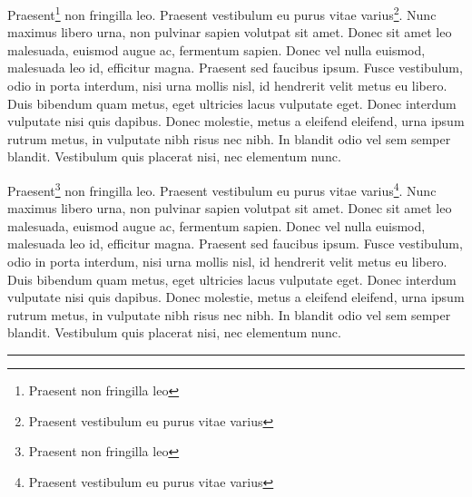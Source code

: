 \documentclass[
]{book}
\newenvironment{env-8f08c627-1fa3-4d4d-933c-e8c841c72ea1}
{
    \savenotes\tcolorbox[blanker,if odd page={left=5pt,borderline west={4pt}{-4pt}{firebrick}}{right=5pt,borderline east={4pt}{-4pt}{firebrick}}]
}
{
    \endtcolorbox\spewnotes
}
\begin{document}
\begin{env-8f08c627-1fa3-4d4d-933c-e8c841c72ea1}

Praesent\footnote{Praesent non fringilla leo} non fringilla leo.
Praesent vestibulum eu purus vitae varius\footnote{Praesent vestibulum
  eu purus vitae varius}. Nunc maximus libero urna, non pulvinar sapien
volutpat sit amet. Donec sit amet leo malesuada, euismod augue ac,
fermentum sapien. Donec vel nulla euismod, malesuada leo id, efficitur
magna. Praesent sed faucibus ipsum. Fusce vestibulum, odio in porta
interdum, nisi urna mollis nisl, id hendrerit velit metus eu libero.
Duis bibendum quam metus, eget ultricies lacus vulputate eget. Donec
interdum vulputate nisi quis dapibus. Donec molestie, metus a eleifend
eleifend, urna ipsum rutrum metus, in vulputate nibh risus nec nibh. In
blandit odio vel sem semper blandit. Vestibulum quis placerat nisi, nec
elementum nunc.

\end{env-8f08c627-1fa3-4d4d-933c-e8c841c72ea1}

\begin{env-8f08c627-1fa3-4d4d-933c-e8c841c72ea1}

Praesent\footnote{Praesent non fringilla leo} non fringilla leo.
Praesent vestibulum eu purus vitae varius\footnote{Praesent vestibulum
  eu purus vitae varius}. Nunc maximus libero urna, non pulvinar sapien
volutpat sit amet. Donec sit amet leo malesuada, euismod augue ac,
fermentum sapien. Donec vel nulla euismod, malesuada leo id, efficitur
magna. Praesent sed faucibus ipsum. Fusce vestibulum, odio in porta
interdum, nisi urna mollis nisl, id hendrerit velit metus eu libero.
Duis bibendum quam metus, eget ultricies lacus vulputate eget. Donec
interdum vulputate nisi quis dapibus. Donec molestie, metus a eleifend
eleifend, urna ipsum rutrum metus, in vulputate nibh risus nec nibh. In
blandit odio vel sem semper blandit. Vestibulum quis placerat nisi, nec
elementum nunc.

\end{env-8f08c627-1fa3-4d4d-933c-e8c841c72ea1}

\begin{center}\rule{0.5\linewidth}{0.5pt}\end{center}
\end{document}
